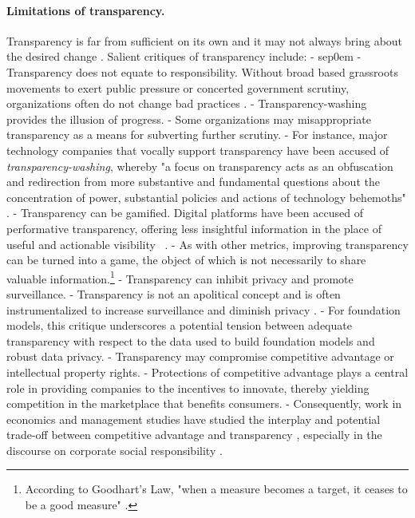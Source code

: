 \paragraph{Limitations of transparency.} 
Transparency is far from sufficient on its own and it may not always bring about the desired change \citep{corbett2023interrogating}. 
Salient critiques of transparency include:
- sep0em
-  Transparency does not equate to responsibility. Without broad based grassroots movements to exert public pressure or concerted government scrutiny, organizations often do not change bad practices \citep{boyd2016algorithmic,ananny2016limits}.
-  Transparency-washing provides the illusion of progress.
- Some organizations may misappropriate transparency as a means for subverting further scrutiny.
- For instance, major technology companies that vocally support transparency have been accused of \emph{transparency-washing}, whereby "a focus on transparency acts as an obfuscation and redirection from more substantive and fundamental questions about the concentration of power, substantial policies and actions of technology behemoths" \citep{zalnieriute2021transparency}.
-  Transparency can be gamified. Digital platforms have been accused of performative transparency, offering less insightful information in the place of useful and actionable visibility ~\citep{doi:10.1177/20539517231164119, Mittelstadt2019}.
- As with other metrics, improving transparency can be turned into a game, the object of which is not necessarily to share valuable information.\footnote{According to Goodhart's Law, "when a measure becomes a target, it ceases to be a good measure" \citep{goodhart1984problems}.}
-  Transparency can inhibit privacy and promote surveillance.
- Transparency is not an apolitical concept and is often instrumentalized to increase surveillance and diminish privacy \citep{han2015transparency,Mohamed2020,birchall2021radical}.
- For foundation models, this critique underscores a potential tension between adequate transparency with respect to the data used to build foundation models and robust data privacy.
-  Transparency may compromise competitive advantage or intellectual property rights.
- Protections of competitive advantage plays a central role in providing companies to the incentives to innovate, thereby yielding competition in the marketplace that benefits consumers.
- Consequently, work in economics and management studies have studied the interplay and potential trade-off between competitive advantage and transparency \citep{bloomfield1999market, granados2013transparency, liu2023competitive}, especially in the discourse on corporate social responsibility \citep{}.

